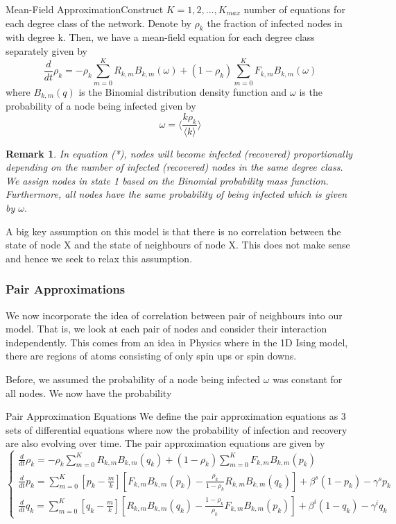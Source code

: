 \documentclass[twoside]{article}
\newtheorem{remark}[theorem]{Remark}
\begin{document}
\begin{proposition_exam}{Mean-Field Approximation}{}Construct $K = 1,2,...,K_{max}$ number of equations for each degree class of the network. Denote by $\rho_k$ the fraction of infected nodes in with degree k. Then, we have a mean-field equation for each degree class separately given by 
\begin{equation}
\frac{d}{dt}\rho_k = -\rho_k\sum_{m=0}^{K}R_{k,m}B_{k,m}(\omega) + (1 - \rho_k)\sum_{m=0}^{K}F_{k,m}B_{k,m}(\omega)
\tag{*}
\end{equation}
where $B_{k,m}(q)$ is the Binomial distribution density function and $\omega$ is the probability of a node being infected given by 
$$
\omega = \big\langle \frac{k\rho_k}{\langle k \rangle} \big\rangle
$$
\end{proposition_exam}

\begin{remark}In equation (*), nodes will become infected (recovered) proportionally depending on the number of infected (recovered) nodes in the same degree class. We assign nodes in state 1 based on the Binomial probability mass function. Furthermore, all nodes have the same probability of being infected which is given by $\omega.$
\end{remark}

A big key assumption on this model is that there is no correlation between the state of node X and the state of neighbours of node X. This does not make sense and hence we seek to relax this assumption.

\subsubsection{Pair Approximations}
We now incorporate the idea of correlation between pair of neighbours into our model. That is, we look at each pair of nodes and consider their interaction independently. This comes from an idea in Physics where in the 1D Ising model, there are regions of atoms consisting of only spin ups or spin downs.

Before, we assumed the probability of a node being infected $\omega$ was constant for all nodes. We now have the probability
\begin{proposition_exam}{Pair Approximation Equations}{}
We define the pair approximation equations as 3 sets of differential equations where now the probability of infection and recovery are also evolving over time. The pair approximation equations are given by
\begin{equation}
\begin{cases}
\frac{d}{dt}\rho_k = -\rho_k\sum_{m=0}^{K}R_{k,m}B_{k,m}(q_k) + (1 - \rho_k)\sum_{m=0}^{K}F_{k,m}B_{k,m}(p_k)\\
\frac{d}{dt}p_k = \sum_{m=0}^{K}[p_k - \frac{m}{k}][F_{k,m}B_{k,m}(p_k) - \frac{\rho_k}{1 - \rho_k} R_{k,m}B_{k,m}(q_k)] + \beta^s(1 - p_k) - \gamma^sp_k\\
\frac{d}{dt}q_k = \sum_{m=0}^{K}[q_k - \frac{m}{k}][R_{k,m}B_{k,m}(q_k) - \frac{1 - \rho_k}{\rho_k} F_{k,m}B_{k,m}(p_k)] + \beta^i(1 - q_k) - \gamma^iq_k
\end{cases}
\tag{*}
\end{equation}
\end{proposition_exam}
\end{document}
